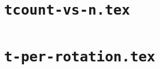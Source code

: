 \documentclass{article}
\begin{document}
\section*{\texttt{tcount-vs-n.tex}}

\clearpage
\section*{\texttt{t-per-rotation.tex}}

\clearpage
\end{document}
